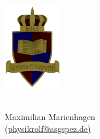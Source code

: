 \documentclass[a4paper, twocolumn, 9pt]{article}
\begin{document}
\vspace*{-2cm}
\parbox{2cm}{\includegraphics[width=2.5cm]{../task/images/ROLF4.png}}
\parbox{5.3cm}{ \\ Maximilian Marienhagen\\ \vspace*{-0.5cm} (\href{mailto:physikrolf@asgspez.de}{physikrolf@asgspez.de)}}
\begin{footnotesize}

\end{footnotesize}
\end{document}
